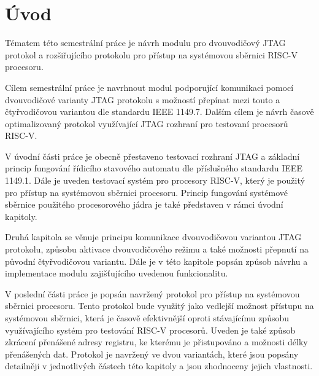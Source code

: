 \chapter*{Úvod}
{}

Tématem této semestrální práce je návrh modulu pro dvouvodičový \acs{JTAG} protokol a rozšiřujícího protokolu pro přístup na systémovou sběrnici \acs{RISC-V} procesoru.

Cílem semestrální práce je navrhnout modul podporující komunikaci pomocí dvouvodičové varianty \acs{JTAG} protokolu s možností přepínat mezi touto a čtyřvodičovou variantou dle standardu IEEE 1149.7. Dalším cílem je návrh časově optimalizovaný protokol využívající \acs{JTAG} rozhraní pro testovaní procesorů \acs{RISC-V}.

V úvodní části práce je obecně přestaveno testovací rozhraní \acs{JTAG} a základní princip fungování řídicího stavového automatu dle příslušného standardu IEEE 1149.1. Dále je uveden testovací systém pro procesory \acs{RISC-V}, který je použitý pro přístup na systémovou sběrnici procesoru. Princip fungování systémové sběrnice použitého procesorového jádra je také představen v rámci úvodní kapitoly.

Druhá kapitola se věnuje principu komunikace dvouvodičovou variantou \acs{JTAG} protokolu, způsobu aktivace dvouvodičového režimu a také možnosti přepnutí na původní čtyřvodičovou variantu. Dále je v této kapitole popsán způsob návrhu a implementace modulu zajišťujícího uvedenou funkcionalitu.

V poslední části práce je popsán navržený protokol pro přístup na systémovou sběrnici procesoru. Tento protokol bude využitý jako vedlejší možnost přístupu na systémovou sběrnici, která je časově efektivnější oproti stávajícímu způsobu využívajícího systém pro testování \acs{RISC-V} procesorů. Uveden je také způsob zkrácení přenášené adresy registru, ke kterému je přistupováno a možnosti délky přenášených dat. Protokol je navržený ve dvou variantách, které jsou popsány detailněji v jednotlivých částech této kapitoly a jsou zhodnoceny jejich vlastnosti.

